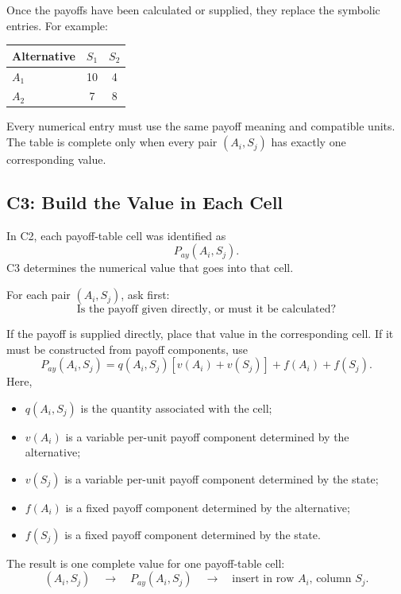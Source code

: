 	Once the payoffs have been calculated or supplied, they replace the
	symbolic entries. For example:
	\begin{center}
		\begin{tabular}{lcc}
			\toprule
			Alternative & $S_1$ & $S_2$ \\
			\midrule
			$A_1$ & 10 & 4 \\
			$A_2$ & 7 & 8 \\
			\bottomrule
		\end{tabular}
	\end{center}
	
	Every numerical entry must use the same payoff meaning and compatible
	units. The table is complete only when every pair \((A_i,S_j)\) has exactly
	one corresponding value.
	
	
	
	\subsection{C3: Build the Value in Each Cell}
	\label{sec:c3-cell-value}
	
	In C2, each payoff-table cell was identified as
	\[
	P_{ay}(A_i,S_j).
	\]
	C3 determines the numerical value that goes into that cell.
	
	For each pair \((A_i,S_j)\), ask first:
	\[
	\text{Is the payoff given directly, or must it be calculated?}
	\]
	
	If the payoff is supplied directly, place that value in the corresponding
	cell. If it must be constructed from payoff components, use
	\[
	P_{ay}(A_i,S_j)
	=
	q(A_i,S_j)
	\left[
	v(A_i)+v(S_j)
	\right]
	+
	f(A_i)
	+
	f(S_j).
	\]
	Here,
	\begin{itemize}
		\item \(q(A_i,S_j)\) is the quantity associated with the cell;
		\item \(v(A_i)\) is a variable per-unit payoff component determined by the alternative;
		\item \(v(S_j)\) is a variable per-unit payoff component determined by the state;
		\item \(f(A_i)\) is a fixed payoff component determined by the alternative;
		\item \(f(S_j)\) is a fixed payoff component determined by the state.
	\end{itemize}
	
	The result is one complete value for one payoff-table cell:
	\[
	(A_i,S_j)
	\quad\longrightarrow\quad
	P_{ay}(A_i,S_j)
	\quad\longrightarrow\quad
	\text{insert in row }A_i\text{, column }S_j.
	\]
	
